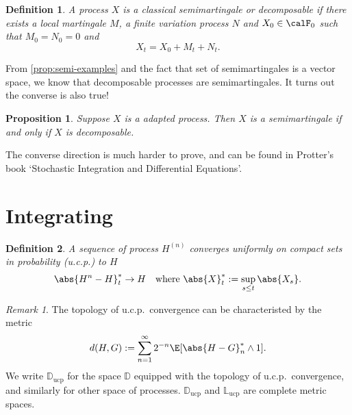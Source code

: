 \documentclass{scrreprt}
\theoremstyle{mydefn}
\newtheorem{defn}{Definition}
\newtheorem{prop}{Proposition}
\theoremstyle{remark}
\newtheorem{remark}{Remark}
\newcommand{\cadspace}{\mathbb D}
\newcommand{\cagspace}{\mathbb L}
\newcommand{\ucp}{\text{ucp}}
\newcommand\defeq{:=}
\begin{document}
\begin{defn}
	A process $X$ is a \emph{classical semimartingale} or \emph{decomposable} if there exists a local martingale $M$, a finite variation process $N$ and $X_0 \in \calF_0$ such that $M_0 = N_0 = 0$ and
	\begin{equation}
		X_t = X_0 + M_t + N_t.
	\end{equation}
\end{defn}

From \vref{prop:semi-examples} and the fact that set of semimartingales is a vector space, we know that decomposable processes are semimartingales. It turns out the converse is also true!

\begin{prop}
	Suppose $X$ is a \cadlag{} adapted process. Then $X$ is a semimartingale if and only if $X$ is decomposable.
\end{prop}

The converse direction is much harder to prove, and can be found in Protter's book `Stochastic Integration and Differential Equations'.

\section{Integrating}

\begin{defn}
	A sequence of process $H^{(n)}$ converges \emph{uniformly on compact sets in probability} (u.c.p.) to $H$
	\begin{equation}
		\abs{H^n - H}^*_t \to H \quad \text{where}\ \abs{X}^*_t \defeq \sup_{s \leq t} \abs{X_s}.
	\end{equation}
\end{defn}
\begin{remark}
	The topology of u.c.p.\ convergence can be characteristed by the metric
	\begin{equation}
		d(H, G) \defeq \sum_{n=1}^{\infty} 2^{-n} \E[\abs{H - G}_n^* \wedge 1].
	\end{equation}
	We write $\cadspace_{\ucp}$ for the space $\cadspace$ equipped with the topology of u.c.p.\ convergence, and similarly for other space of processes. $\cadspace_{\ucp}$ and $\cagspace_{\ucp}$ are complete metric spaces.
\end{remark}
\end{document}
